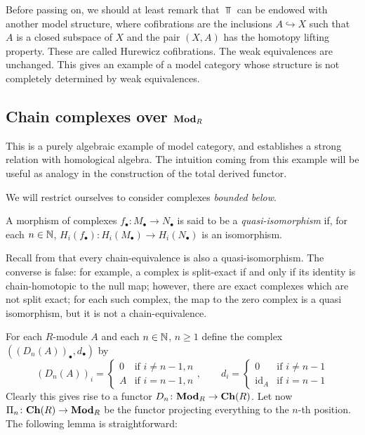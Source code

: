 \begin{refsection}
Before passing on, we should at least remark that $\Top$ can be endowed with another model structure, where cofibrations are the inclusions $A \hookrightarrow X$ such that $A$ is a closed subspace of $X$ and the pair $(X,A)$ has the homotopy lifting property. These are called Hurewicz cofibrations. The weak equivalences are unchanged. This gives an example of a model category whose structure is not completely determined by weak equivalences.

\subsection{Chain complexes over $\mathbf{Mod}_R$}

This is a purely algebraic example of model category, and establishes a strong relation with homological algebra. The intuition coming from this example will be useful as analogy in the construction of the total derived functor.

We will restrict ourselves to consider complexes \emph{bounded below}.

\begin{defin}
A morphism of complexes $f_\bullet \colon M_\bullet \to N_\bullet$ is said to be a \emph{quasi-isomorphism} if, for each $n \in \mathbb{N}$, $H_i(f_\bullet) \colon H_i(M_\bullet) \to H_i(N_\bullet)$ is an isomorphism.
\end{defin}

\begin{rmk}
Recall from \cite[Ch. I]{weibel} that every chain-equivalence is also a quasi-isomorphism. The converse is false: for example, a complex is split-exact if and only if its identity is chain-homotopic to the null map; however, there are exact complexes which are not split exact; for each such complex, the map to the zero complex is a quasi isomorphism, but it is not a chain-equivalence.
\end{rmk}

For each $R$-module $A$ and each $n \in \mathbb{N}$, $n \ge 1$ define the complex $((D_n(A))_\bullet,d_\bullet)$ by
\[
(D_n(A))_i = \begin{cases} 0 & \text{if } i \ne n - 1, n \\ A & \text{if } i = n-1,n \end{cases}, \qquad d_i = \begin{cases} 0 & \text{if } i \ne n-1 \\ \mathrm{id}_A & \text{if } i = n-1 \end{cases}
\]
Clearly this gives rise to a functor $D_n \colon \mathbf{Mod}_R \to \mathbf{Ch}(R)$. Let now $\Pi_n \colon \mathbf{Ch}(R) \to \mathbf{Mod}_R$ be the functor projecting everything to the $n$-th position. The following lemma is straightforward:


\end{refsection}
